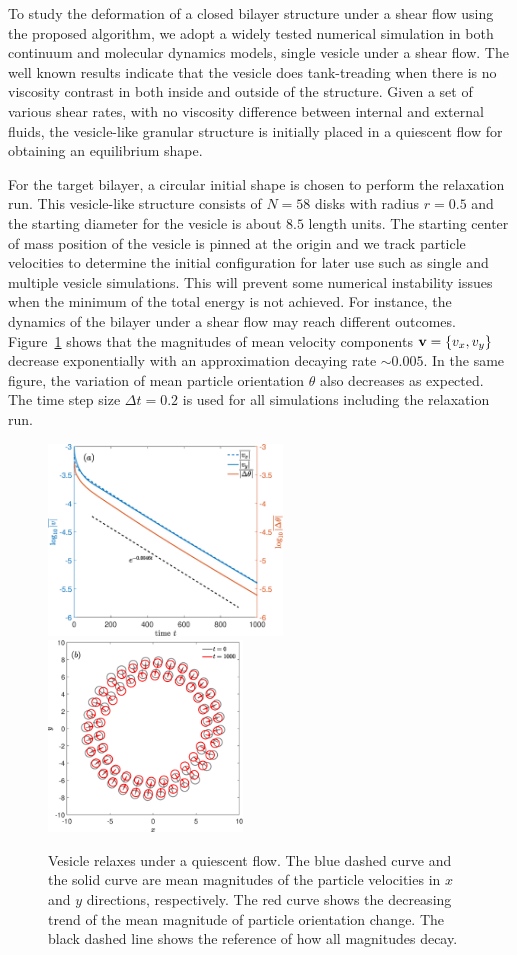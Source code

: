 \documentclass[lineno]{jfm}
\begin{document}
To study the deformation of a closed bilayer structure under a shear flow using the proposed algorithm, 
we adopt a widely tested numerical simulation in both continuum and molecular dynamics models, single vesicle under a shear flow. The well known results indicate that the vesicle does tank-treading when there is no viscosity contrast in both inside and outside of the structure.
Given a set of various shear rates, with no viscosity difference between internal and external fluids, 
the vesicle-like granular structure is initially placed in a quiescent flow for obtaining an equilibrium shape.


For the target bilayer, a circular initial shape is chosen to perform the relaxation run. This vesicle-like 
structure consists of $N=58$ disks with radius $r=0.5$ and the starting diameter for the vesicle is about 
$8.5$ length units.
The starting center of mass position of the vesicle is pinned at the origin and we track particle velocities 
to determine the initial configuration for later use such as single and multiple vesicle simulations. This will prevent some numerical instability issues when the minimum of the total energy is not achieved. For instance, the dynamics of the bilayer under a shear flow may reach different outcomes.
Figure~\ref{figure2} shows that the magnitudes of mean velocity components ${\bf v}=\{v_x,v_y\}$ decrease exponentially with an approximation decaying rate $\sim0.005$. In the same figure, the variation of mean particle orientation $\theta$ also decreases as expected. The time step size 
$\Delta t=0.2$ is used for all simulations including the relaxation run.

\begin{figure}
\centering
\includegraphics[height=2in]{relax.eps}
\includegraphics[height=2in]{relax2.eps}
  \caption{Vesicle relaxes under a quiescent flow. The blue dashed curve and the solid curve are mean magnitudes of the particle velocities in $x$ and $y$ directions, respectively. The red curve shows the decreasing trend of the mean magnitude of particle orientation change. The black dashed line shows the reference of how all magnitudes decay.
  }
    \label{figure2}
\end{figure}
\end{document}
